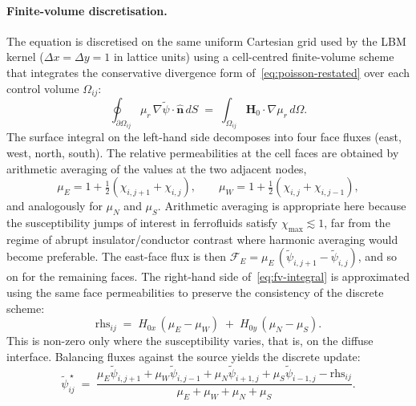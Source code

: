 \paragraph{Finite-volume discretisation.}
The equation is discretised on the same uniform Cartesian grid used by the LBM kernel ($\Delta x = \Delta y = 1$ in lattice units) using a cell-centred finite-volume scheme that integrates the conservative divergence form of~\eqref{eq:poisson-restated} over each control volume $\Omega_{ij}$:
\begin{equation}
\oint_{\partial\Omega_{ij}}\!\mu_r\,\nabla\tilde{\psi}\!\cdot\!\hat{\bm{n}}\,dS
\;=\; \int_{\Omega_{ij}}\!\bm{H}_0\!\cdot\!\nabla\mu_r\,d\Omega.
\label{eq:fv-integral}
\end{equation}
The surface integral on the left-hand side decomposes into four face fluxes (east, west, north, south).
The relative permeabilities at the cell faces are obtained by arithmetic averaging of the values at the two adjacent nodes,
\begin{equation}
\mu_E = 1 + \tfrac{1}{2}(\chi_{i,j+1} + \chi_{i,j}),
\qquad
\mu_W = 1 + \tfrac{1}{2}(\chi_{i,j} + \chi_{i,j-1}),
\label{eq:mu-faces}
\end{equation}
and analogously for $\mu_N$ and $\mu_S$.
Arithmetic averaging is appropriate here because the susceptibility jumps of interest in ferrofluids satisfy $\chi_{\max} \lesssim 1$, far from the regime of abrupt insulator/conductor contrast where harmonic averaging would become preferable.
The east-face flux is then $\mathcal{F}_E = \mu_E\,(\tilde{\psi}_{i,j+1} - \tilde{\psi}_{i,j})$, and so on for the remaining faces.
The right-hand side of~\eqref{eq:fv-integral} is approximated using the same face permeabilities to preserve the consistency of the discrete scheme:
\begin{equation}
\mathrm{rhs}_{ij}
    \;=\; H_{0x}\,(\mu_E - \mu_W) \;+\; H_{0y}\,(\mu_N - \mu_S).
\label{eq:rhs-poisson}
\end{equation}
This is non-zero only where the susceptibility varies, that is, on the diffuse interface.
Balancing fluxes against the source yields the discrete update:
\begin{equation}
\tilde{\psi}_{ij}^{\,\star}
\;=\; \frac{\mu_E\tilde{\psi}_{i,j+1} + \mu_W\tilde{\psi}_{i,j-1} + \mu_N\tilde{\psi}_{i+1,j} + \mu_S\tilde{\psi}_{i-1,j} - \mathrm{rhs}_{ij}}{\mu_E + \mu_W + \mu_N + \mu_S}.
\label{eq:gauss-seidel}
\end{equation}

